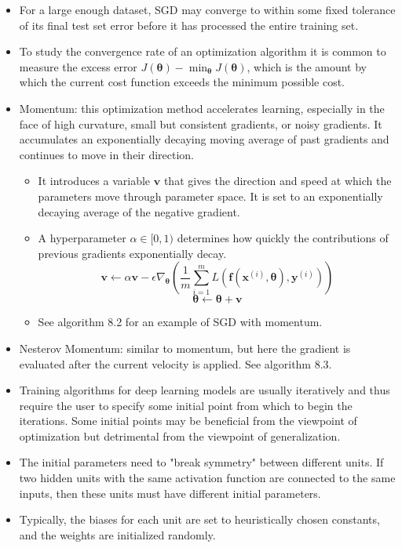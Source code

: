 \documentclass{article}
\begin{document}
\begin{itemize}
\item For a large enough dataset, SGD may converge to within some fixed tolerance of its final test set error before it has processed the entire training set.
\item To study the convergence rate of an optimization algorithm it is common to measure the excess error \(J(\boldsymbol{\theta}) - \min_{\boldsymbol{\theta}}J(\boldsymbol{\theta})\), which is the amount by which the current cost function exceeds the minimum possible cost.
\item Momentum: this optimization method accelerates learning, especially in the face of high curvature, small but consistent gradients, or noisy gradients. It accumulates an exponentially decaying moving average of past gradients and continues to move in their direction.
\begin{itemize}
\item It introduces a variable \(\boldsymbol{v}\) that gives the direction and speed at which the parameters move through parameter space. It is set to an exponentially decaying average of the negative gradient.
\item A hyperparameter \(\alpha \in [0, 1)\) determines how quickly the contributions of previous gradients exponentially decay.
\[
	\boldsymbol{v} \gets \alpha\boldsymbol{v} - \epsilon\nabla_{\boldsymbol{\theta}}\left(\frac{1}{m}\sum^m_{i = 1} L(\boldsymbol{f}(\boldsymbol{x}^{(i)}, \boldsymbol{\theta}), \boldsymbol{y}^{(i)})\right)
\]\[
    \boldsymbol{\theta} \gets \boldsymbol{\theta} + \boldsymbol{v}
\]
\item See algorithm 8.2 for an example of SGD with momentum.
\end{itemize}
\item Nesterov Momentum: similar to momentum, but here the gradient is evaluated after the current velocity is applied. See algorithm 8.3.
\item Training algorithms for deep learning models are usually iteratively and thus require the user to specify some initial point from which to begin the iterations. Some initial points may be beneficial from the viewpoint of optimization but detrimental from the viewpoint of generalization.
\item The initial parameters need to "break symmetry" between different units. If two hidden units with the same activation function are connected to the same inputs, then these units must have different initial parameters.
\item Typically, the biases for each unit are set to heuristically chosen constants, and the weights are initialized randomly.

\end{itemize}
\end{document}
